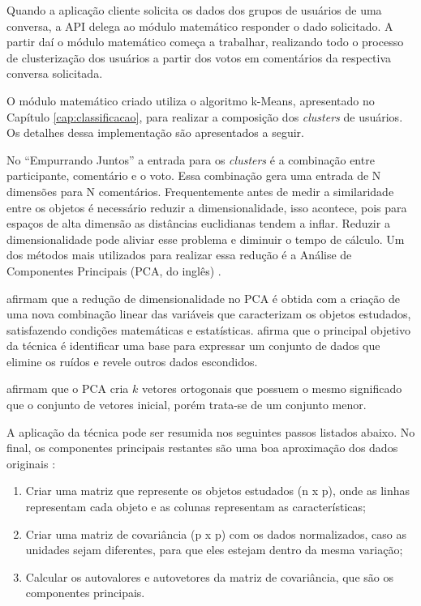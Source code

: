     
    Quando a aplicação cliente solicita os dados dos grupos de usuários de uma conversa,
    a API delega ao módulo matemático responder o dado solicitado. A partir daí o módulo
    matemático começa a trabalhar, realizando todo o processo de clusterização dos usuários
    a partir dos votos em comentários da respectiva conversa solicitada.
    
    O módulo matemático criado utiliza o algoritmo k-Means, apresentado no Capítulo \ref{cap:classificacao},
    para realizar a composição dos \textit{clusters} de usuários.
    Os detalhes dessa implementação são apresentados a seguir.

    No ``Empurrando Juntos'' a entrada para os \textit{clusters} é a combinação entre participante,  
    comentário e o voto. Essa combinação gera uma entrada de N dimensões para N comentários.
    Frequentemente antes de medir a similaridade entre os objetos é necessário
    reduzir a dimensionalidade, isso acontece, pois para espaços de alta dimensão as distâncias euclidianas
    tendem a inflar. Reduzir a dimensionalidade pode aliviar esse problema e diminuir o tempo de cálculo.
    Um dos métodos mais utilizados para realizar essa redução é a Análise de 
    Componentes Principais (PCA, do inglês) \cite{han2011data, sklearn}.

     afirmam que a redução de dimensionalidade no PCA é
    obtida com a criação de uma nova combinação linear das variáveis que caracterizam os
    objetos estudados, satisfazendo condições matemáticas e estatísticas.
     afirma que o principal objetivo da técnica é identificar
    uma base para expressar um conjunto de dados que elimine os ruídos e revele 
    outros dados escondidos.

     afirmam que o PCA 
    cria $k$ vetores ortogonais que possuem o mesmo significado que o conjunto
    de vetores inicial, porém trata-se de um conjunto menor. 

    A aplicação da técnica pode ser resumida nos seguintes passos listados abaixo.
    No final, os componentes principais restantes são uma boa aproximação dos 
    dados originais \cite{han2011data, mackiewicz1993principal, varella2008analise}: 

    \begin{enumerate}
      \item Criar uma matriz que represente os objetos estudados (n x p), onde as linhas representam cada objeto e as colunas representam as características;
      \item Criar uma matriz de covariância (p x p) com os dados normalizados, caso as unidades sejam diferentes,
	para que eles estejam dentro da mesma variação;
      \item Calcular os autovalores e autovetores da matriz de covariância, que 
      são os componentes principais.
    \end{enumerate}

